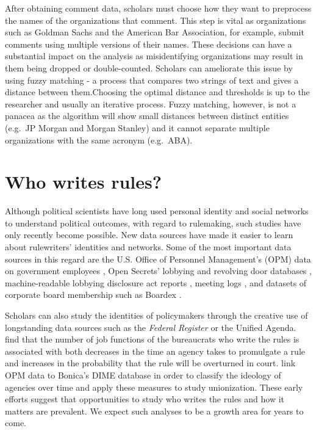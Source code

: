 \documentclass[
      12pt,
        ]{article}
\let\footnote = \endnote
\begin{document}
\indent After obtaining comment data, scholars must choose how they want
to preprocess the names of the organizations that comment. This step is
vital as organizations such as Goldman Sachs and the American Bar
Association, for example, submit comments using multiple versions of
their names. These decisions can have a substantial impact on the
analysis as misidentifying organizations may result in them being
dropped or double-counted. Scholars can ameliorate this issue by using
fuzzy matching - a process that compares two strings of text and gives a
distance between them.Choosing the optimal distance and thresholds is up
to the researcher and usually an iterative process. Fuzzy matching,
however, is not a panacea as the algorithm will show small distances
between distinct entities (e.g.~JP Morgan and Morgan Stanley) and it
cannot separate multiple organizations with the same acronym (e.g.~ABA).

\hypertarget{who-writes-rules}{%
\section{Who writes rules?}\label{who-writes-rules}}

Although political scientists have long used personal identity and
social networks to understand political outcomes, with regard to
rulemaking, such studies have only recently become possible. New data
sources have made it easier to learn about rulewriters' identities and
networks. Some of the most important data sources in this regard are the
U.S. Office of Personnel Management's (OPM) data on government employees
\citep[e.g.,][]{BoltonAMP2018},\footnote{Note that the dataset
  \citet{BoltonAMP2018} used is not public.} Open Secrets' lobbying
\citep[e.g.,][]{Baumgartner2009} and revolving door databases
\citep[e.g.,][]{VidalAER2012, BertrandAER2014}, machine-readable
lobbying disclosure act reports
\citep[e.g.,][]{BoehmkeJPP2013, YouJOP2017, Dwidar2019SPSA}, meeting
logs \citep{LibgoberQJPS}, and datasets of corporate board membership
such as Boardex \citep[e.g.,][]{ShiveROF2016}.

Scholars can also study the identities of policymakers through the
creative use of longstanding data sources such as the \emph{Federal
Register} or the Unified Agenda. \citet{CarriganPAR2019} find that the
number of job functions of the bureaucrats who write the rules is
associated with both decreases in the time an agency takes to promulgate
a rule and increases in the probability that the rule will be overturned
in court. \citet{ChenJTP2015} link OPM data to Bonica's DIME database in
order to classify the ideology of agencies over time and apply these
measures to study unionization. These early efforts suggest that
opportunities to study who writes the rules and how it matters are
prevalent. We expect such analyses to be a growth area for years to
come.
\end{document}
